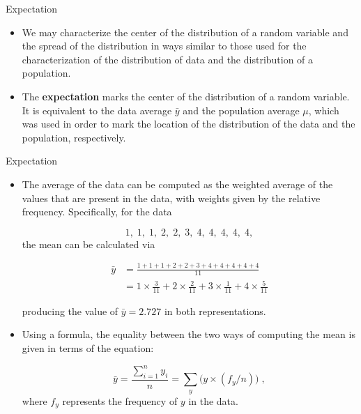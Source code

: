 \documentclass[10pt]{beamer}\usepackage[]{graphicx}\usepackage[]{color}
\begin{document}
\begin{frame}[fragile]{Expectation}
	\small
	\begin{itemize}[<+->]
		
		\item We may characterize the center of the distribution of a random variable
		and the spread of the distribution in ways similar to those used for the
		characterization of the distribution of data and the distribution of a
		population.
		
		\item The \textbf{expectation} marks the center of the distribution of a random
		variable. It is equivalent to the data average $\bar y$ and the
		population average $\mu$, which was used in order to mark the location
		of the distribution of the data and the population, respectively.
		

	\end{itemize}
	
\end{frame}



\begin{frame}[fragile]{Expectation}
	\small
	\begin{itemize}[<+->]
		
		\item The average of the data can be computed as the weighted average of the values that are present
		in the data, with weights given by the relative frequency. Specifically,
		for the data
		
		$$1,\; 1,\; 1,\; 2,\; 2,\; 3,\; 4,\; 4,\; 4,\; 4,\; 4,$$ the mean can be calculated via
		
		\begin{align*}
			\bar{y} &= \frac{1 + 1 + 1 + 2 + 2 + 3 + 4 + 4 + 4 + 4 + 4}{11}\\
			& =	1\times \frac{3}{11} + 2 \times \frac{2}{11} + 3 \times \frac{1}{11} + 4 \times \frac{5}{11}
		\end{align*}

		producing the value of $\bar y =2.727$ in both representations. 
		
		\item Using a formula, the equality between the two ways of computing the mean is
		given in terms of the equation:
		
		$$\bar y = \frac{\sum_{i=1}^n y_i}{n} = \sum_y \big(y \times (f_y/n)\big)\;,$$
		where $f_y$ represents the frequency of $y$ in the data. 
		

		
		
	\end{itemize}
	
\end{frame}
\end{document}
